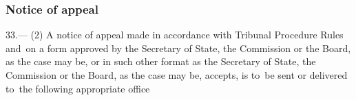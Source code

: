 \documentclass[12pt,a4paper]{article}
\begin{document}
\subsubsection[33. 
Notice of appeal  %
]{%
Notice of appeal  %
}

33.—%
%
%
%
%
%
(2) 
A notice of appeal made in accordance with Tribunal Procedure Rules and~on a form approved by the Secretary of State, the Commission or the Board, as the case may be, or in such other format as the Secretary of State, the Commission or the Board, as the case may be, accepts, is to~be sent or delivered to~the following appropriate office%
\end{document}
